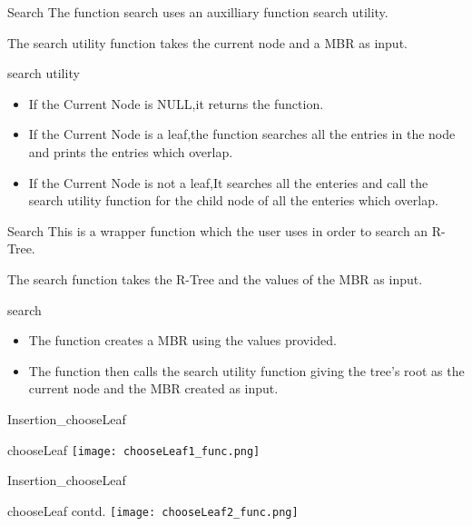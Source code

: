 \documentclass{beamer}
\begin{document}
\begin{frame}{Search}
    The function search uses an auxilliary function search utility.
    
    The search utility function takes the current node and a MBR as input.
    \begin{block}{search utility}
       \begin{itemize}
           \item If the Current Node is NULL,it returns the function.
           \item If the Current Node is a leaf,the function searches all the entries in the node and prints the entries which overlap.
           \item If the Current Node is not a leaf,It searches all the enteries and call the search utility function for the child node of all the enteries which overlap.
       \end{itemize}
    \end{block}
\end{frame}
\begin{frame}{Search}
       This is a wrapper function which the user uses in order to search an R-Tree.

       The search function takes the R-Tree and the values of the MBR as input.
       \begin{block}{search}
       \begin{itemize}
           \item The function creates a MBR using the values provided.
           \item The function then calls the search utility function giving the tree's root as the current node and the MBR created as input.
       \end{itemize}

       
    \end{block}
\end{frame}
\begin{frame}{Insertion_{chooseLeaf}}
    \begin{block}{chooseLeaf}
       \texttt{[image: chooseLeaf1\_func.png]}
    \end{block}
\end{frame}
\begin{frame}{Insertion_{chooseLeaf}}
    \begin{block}{chooseLeaf contd.}
       \texttt{[image: chooseLeaf2\_func.png]}
    \end{block}
\end{frame}
\end{document}
